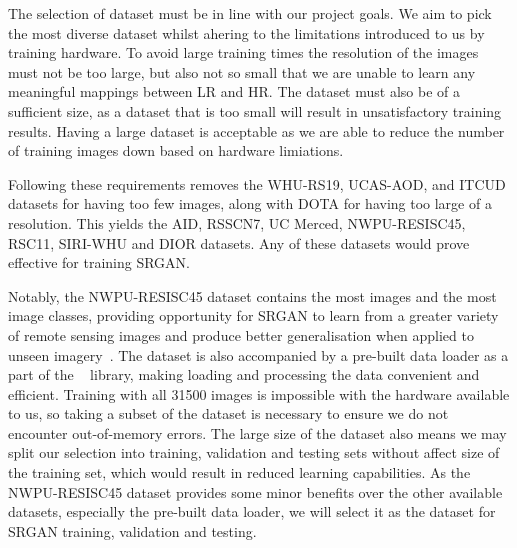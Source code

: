 The selection of dataset must be in line with our project goals. We aim to pick the most diverse dataset whilst ahering to the limitations introduced to us by training hardware. To avoid large training times the resolution of the images must not be too large, but also not so small that we are unable to learn any meaningful mappings between LR and HR. The dataset must also be of a sufficient size, as a dataset that is too small will result in unsatisfactory training results. Having a large dataset is acceptable as we are able to reduce the number of training images down based on hardware limiations.

Following these requirements removes the WHU-RS19, UCAS-AOD, and ITCUD datasets for having too few images, along with DOTA for having too large of a resolution. This yields the AID, RSSCN7, UC Merced, NWPU-RESISC45, RSC11, SIRI-WHU and DIOR datasets. Any of these datasets would prove effective for training SRGAN.

Notably, the NWPU-RESISC45 dataset contains the most images and the most image classes, providing opportunity for SRGAN to learn from a greater variety of remote sensing images and produce better generalisation when applied to unseen imagery~\cite{ref}. The dataset is also accompanied by a pre-built data loader as a part of the ~\cite{ref}  library, making loading and processing the data convenient and efficient. Training with all 31500 images is impossible with the hardware available to us, so taking a subset of the dataset is necessary to ensure we do not encounter out-of-memory errors. The large size of the dataset also means we may split our selection into training, validation and testing sets without affect size of the training set, which would result in reduced learning capabilities. As the NWPU-RESISC45 dataset provides some minor benefits over the other available datasets, especially the pre-built data loader, we will select it as the dataset for SRGAN training, validation and testing. 

